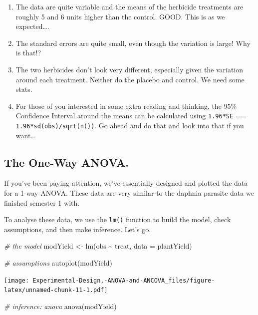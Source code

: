 \documentclass[
]{book}
\newenvironment{Shaded}{\begin{snugshade}}{\end{snugshade}}
\newcommand{\AttributeTok}[1]{\textcolor[rgb]{0.77,0.63,0.00}{#1}}
\newcommand{\CommentTok}[1]{\textcolor[rgb]{0.56,0.35,0.01}{\textit{#1}}}
\newcommand{\FunctionTok}[1]{\textcolor[rgb]{0.00,0.00,0.00}{#1}}
\newcommand{\NormalTok}[1]{#1}
\newcommand{\OtherTok}[1]{\textcolor[rgb]{0.56,0.35,0.01}{#1}}
\newcommand{\SpecialCharTok}[1]{\textcolor[rgb]{0.00,0.00,0.00}{#1}}
\providecommand{\tightlist}{%
  \setlength{\itemsep}{0pt}\setlength{\parskip}{0pt}}
\begin{document}
\begin{enumerate}
\def\labelenumi{\arabic{enumi}.}
\tightlist
\item
  The data are quite variable and the means of the herbicide treatments are roughly 5 and 6 units higher than the control. GOOD. This is as we expected\ldots.
\item
  The standard errors are quite small, even though the variation is large! Why is that!?
\item
  The two herbicides don't look very different, especially given the variation around each treatment. Neither do the placebo and control. We need some stats.
\item
  For those of you interested in some extra reading and thinking, the 95\% Confidence Interval around the means can be calculated using \texttt{1.96*SE} == \texttt{1.96*sd(obs)/sqrt(n())}. Go ahead and do that and look into that if you want\ldots{}
\end{enumerate}

\hypertarget{the-one-way-anova.}{%
\subsection{The One-Way ANOVA.}\label{the-one-way-anova.}}

If you've been paying attention, we've essentially designed and plotted the data for a 1-way ANOVA. These data are very similar to the daphnia parasite data we finished semester 1 with.

To analyse these data, we use the \texttt{lm()} function to build the model, check assumptions, and then make inference. Let's go.

\begin{Shaded}
\begin{Highlighting}[]
\CommentTok{\# the model}
\NormalTok{modYield }\OtherTok{\textless{}{-}} \FunctionTok{lm}\NormalTok{(obs }\SpecialCharTok{\textasciitilde{}}\NormalTok{ treat, }\AttributeTok{data =}\NormalTok{ plantYield)}

\CommentTok{\# assumptions}
\FunctionTok{autoplot}\NormalTok{(modYield)}
\end{Highlighting}
\end{Shaded}

\texttt{[image: Experimental-Design,-ANOVA-and-ANCOVA\_files/figure-latex/unnamed-chunk-11-1.pdf]}

\begin{Shaded}
\begin{Highlighting}[]
\CommentTok{\# inference: anova}
\FunctionTok{anova}\NormalTok{(modYield)}
\end{Highlighting}
\end{Shaded}
\end{document}
